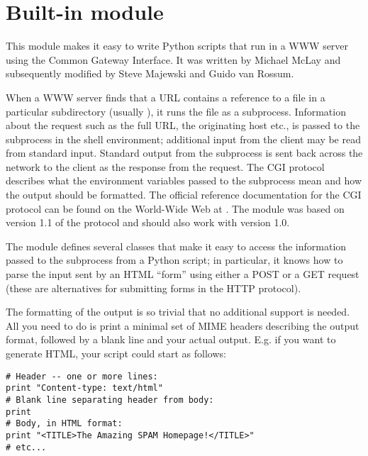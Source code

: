 \section{Built-in module }

\renewcommand{\indexsubitem}{(in module cgi)}

This module makes it easy to write Python scripts that run in a WWW
server using the Common Gateway Interface.  It was written by Michael
McLay and subsequently modified by Steve Majewski and Guido van
Rossum.

When a WWW server finds that a URL contains a reference to a file in a
particular subdirectory (usually ), it runs the file as
a subprocess.  Information about the request such as the full URL, the
originating host etc., is passed to the subprocess in the shell
environment; additional input from the client may be read from
standard input.  Standard output from the subprocess is sent back
across the network to the client as the response from the request.
The CGI protocol describes what the environment variables passed to
the subprocess mean and how the output should be formatted.  The
official reference documentation for the CGI protocol can be found on
the World-Wide Web at
.  The
 module was based on version 1.1 of the protocol and should
also work with version 1.0.

The  module defines several classes that make it easy to
access the information passed to the subprocess from a Python script;
in particular, it knows how to parse the input sent by an HTML
``form'' using either a POST or a GET request (these are alternatives
for submitting forms in the HTTP protocol).

The formatting of the output is so trivial that no additional support
is needed.  All you need to do is print a minimal set of MIME headers
describing the output format, followed by a blank line and your actual
output.  E.g. if you want to generate HTML, your script could start as
follows:

\begin{verbatim}
# Header -- one or more lines:
print "Content-type: text/html"
# Blank line separating header from body:
print
# Body, in HTML format:
print "<TITLE>The Amazing SPAM Homepage!</TITLE>"
# etc...
\end{verbatim}

